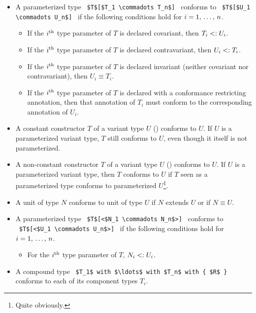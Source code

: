 \begin{itemize}
  \item A parameterized type ~\lstinline!$T$[$T_1 \commadots T_n$]!~ conforms to ~\lstinline!$T$[$U_1 \commadots U_n$]!~ if the following conditions hold for $i = 1 ,\, \ldots ,\, n$.
    \begin{itemize}
      \item If the $i^{\mbox{\scriptsize th}}$ type parameter of $T$ is declared covariant, then $T_i <: U_i$.
      \item If the $i^{\mbox{\scriptsize th}}$ type parameter of $T$ is declared contravariant, then $U_i <: T_i$.
      \item If the $i^{\mbox{\scriptsize th}}$ type parameter of $T$ is declared invariant (neither covariant nor contravariant), then $U_i \equiv T_i$.
      \item If the $i^{\mbox{\scriptsize th}}$ type parameter of $T$ is declared with a conformance restricting annotation, then that annotation of $T_i$ must conform to the corresponding annotation of $U_i$. 
    \end{itemize}
    
  \item A constant constructor $T$ of a variant type $U$ () conforms to $U$. If $U$ is a parameterized variant type, $T$ still conforms to $U$, even though it itself is not parameterized. 
  
  \item A non-constant constructor $T$ of a variant type $U$ () conforms to $U$. If $U$ is a parameterized variant type, then $T$ conforms to $U$ if $T$ seen as a parameterized type conforms to parameterized $U$\footnote{Quite obviously.}. 

  \item A unit of type $N$ conforms to unit of type $U$ if $N$ extends $U$ or if $N \equiv U$. 

  \item A parameterized type ~\lstinline!$T$[<$N_1 \commadots N_n$>]!~ conforms to ~\lstinline!$T$[<$U_1 \commadots U_n$>]!~ if the following conditions hold for $i = 1 ,\, \ldots ,\, n$.
    \begin{itemize}
      \item For the $i^{\mbox{\scriptsize th}}$ type parameter of $T$, $N_i <: U_i$.
    \end{itemize}

  \item A compound type ~\lstinline!$T_1$ with $\ldots$ with $T_n$ with { $R$ }!~ conforms to each of its component types $T_i$.
  

\end{itemize}
